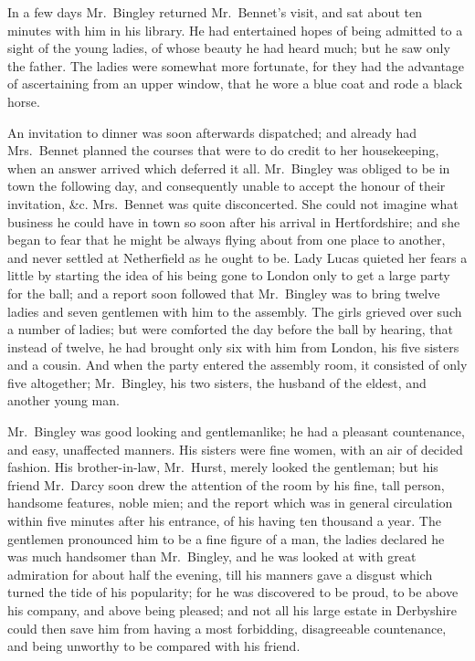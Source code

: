 In a few days Mr.\ Bingley returned Mr.\ Bennet’s visit,
and sat about ten minutes with him in his library. He
had entertained hopes of being admitted to a sight of the
young ladies, of whose beauty he had heard much; but
he saw only the father. The ladies were somewhat more
fortunate, for they had the advantage of ascertaining from
an upper window, that he wore a blue coat and rode a black
horse.

An invitation to dinner was soon afterwards dispatched;
and already had Mrs.\ Bennet planned the courses that were
to do credit to her housekeeping, when an answer arrived
which deferred it all. Mr.\ Bingley was obliged to be in
town the following day, and consequently unable to accept
the honour of their invitation, \&c. Mrs.\ Bennet was
quite disconcerted. She could not imagine what business
he could have in town so soon after his arrival in
Hertfordshire; and she began to fear that he might be always
flying about from one place to another, and never settled
at Netherfield as he ought to be. Lady Lucas quieted her
fears a little by starting the idea of his being gone to
London only to get a large party for the ball; and a report
soon followed that Mr.\ Bingley was to bring twelve ladies
and seven gentlemen with him to the assembly. The girls
grieved over such a number of ladies; but were comforted
the day before the ball by hearing, that instead of twelve,
he had brought only six with him from London, his five
sisters and a cousin. And when the party entered the
assembly room, it consisted of only five altogether;
Mr.\ Bingley, his two sisters, the husband of the eldest,
and another young man.

Mr.\ Bingley was good looking and gentlemanlike; he
had a pleasant countenance, and easy, unaffected manners.
His sisters were fine women, with an air of decided fashion.
His brother-in-law, Mr.\ Hurst, merely looked the gentleman;
but his friend Mr.\ Darcy soon drew the attention
of the room by his fine, tall person, handsome features,
noble mien; and the report which was in general circulation
within five minutes after his entrance, of his having
ten thousand a year. The gentlemen pronounced him to
be a fine figure of a man, the ladies declared he was much
handsomer than Mr.\ Bingley, and he was looked at with
great admiration for about half the evening, till his
manners gave a disgust which turned the tide of his
popularity; for he was discovered to be proud, to be
above his company, and above being pleased; and not
all his large estate in Derbyshire could then save him from
having a most forbidding, disagreeable countenance, and
being unworthy to be compared with his friend.

